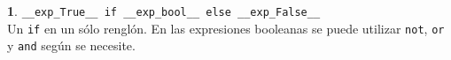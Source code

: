 \documentclass[12pt]{article}
\theoremstyle{definition}
\newtheorem{funcion}{}[section]
\begin{document}
\begin{funcion} \verb|__exp_True__ if __exp_bool__ else __exp_False__| \\[1ex]
  Un \verb|if| en un sólo renglón. En las expresiones booleanas se puede utilizar \verb|not|, \verb|or| y \verb|and| según se necesite.
\end{funcion}

\end{document}
